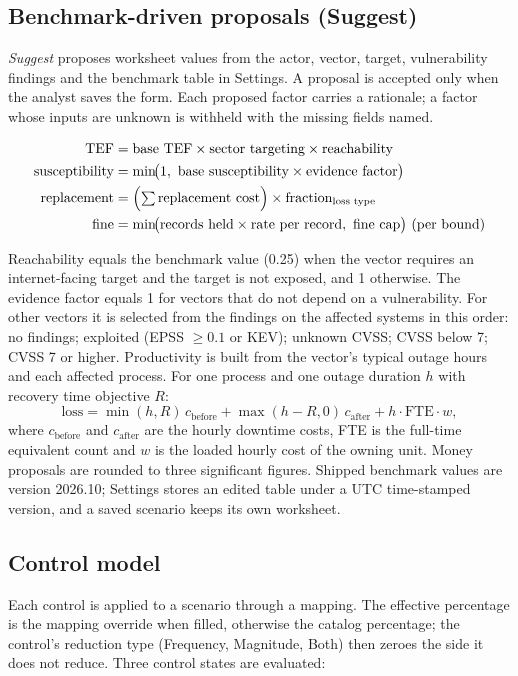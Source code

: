 \documentclass[11pt,a4paper]{article}
\begin{document}
\subsection{Benchmark-driven proposals (Suggest)}
\emph{Suggest} proposes worksheet values from the actor, vector, target, vulnerability findings and the benchmark table in Settings. A proposal is accepted only when the analyst saves the form. Each proposed factor carries a rationale; a factor whose inputs are unknown is withheld with the missing fields named.

\begin{align}
\text{TEF} &= \text{base TEF}\times\text{sector targeting}\times\text{reachability}\\
\text{susceptibility} &= \min\!\bigl(1,\ \text{base susceptibility}\times\text{evidence factor}\bigr)\\
\text{replacement} &= \Bigl(\textstyle\sum \text{replacement cost}\Bigr)\times\text{fraction}_{\text{loss type}}\\
\text{fine} &= \min\!\bigl(\text{records held}\times\text{rate per record},\ \text{fine cap}\bigr)\ \text{(per bound)}
\end{align}

Reachability equals the benchmark value (0.25) when the vector requires an internet-facing target and the target is not exposed, and 1 otherwise. The evidence factor equals 1 for vectors that do not depend on a vulnerability. For other vectors it is selected from the findings on the affected systems in this order: no findings; exploited (EPSS $\ge 0.1$ or KEV); unknown CVSS; CVSS below 7; CVSS 7 or higher. Productivity is built from the vector's typical outage hours and each affected process. For one process and one outage duration $h$ with recovery time objective $R$:
\begin{equation}
\text{loss} = \min(h,R)\,c_{\text{before}} + \max(h-R,0)\,c_{\text{after}} + h\cdot \text{FTE}\cdot w,
\end{equation}
where $c_{\text{before}}$ and $c_{\text{after}}$ are the hourly downtime costs, FTE is the full-time equivalent count and $w$ is the loaded hourly cost of the owning unit. Money proposals are rounded to three significant figures. Shipped benchmark values are version 2026.10; Settings stores an edited table under a UTC time-stamped version, and a saved scenario keeps its own worksheet.

\subsection{Control model}
Each control is applied to a scenario through a mapping. The effective percentage is the mapping override when filled, otherwise the catalog percentage; the control's reduction type (Frequency, Magnitude, Both) then zeroes the side it does not reduce. Three control states are evaluated:
\end{document}
